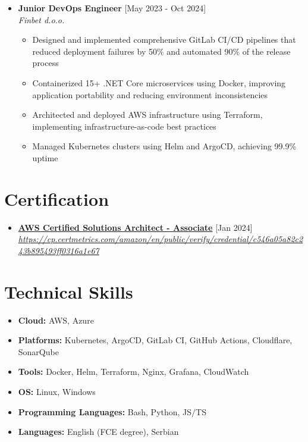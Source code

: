 \documentclass[12pt,a4paper]{moderncv}
\begin{document}
\begin{itemize}
	\item \textbf{Junior DevOps Engineer} \hfill [May 2023 - Oct 2024]\\
	\textit{Finbet d.o.o.}
	\begin{itemize}
		\vspace{-0.75em}
		\setlength\itemsep{0.1em}
		\item Designed and implemented comprehensive GitLab CI/CD pipelines that reduced deployment failures by 50\% and automated 90\% of the release process
		\item Containerized 15+ .NET Core microservices using Docker, improving application portability and reducing environment inconsistencies
		\item Architected and deployed AWS infrastructure using Terraform, implementing infrastructure-as-code best practices
		\item Managed Kubernetes clusters using Helm and ArgoCD, achieving 99.9\% uptime
	\end{itemize}

\end{itemize}

\section{Certification}

\begin{itemize}
	\item \textbf{\href{https://aws.amazon.com/certification/certified-solutions-architect-associate/}{AWS Certified Solutions Architect - Associate}} \hfill [Jan 2024]\\
	\fontsize{8}{1}\textit{\href{https://cp.certmetrics.com/amazon/en/public/verify/credential/c546a05a82c243b895493ff0316a1e67}{https://cp.certmetrics.com/amazon/en/public/verify/credential/c546a05a82c243b895493ff0316a1e67}}
	
\end{itemize}


\section{Technical Skills}

\begin{itemize}
		
	\item \textbf{Cloud: } AWS, Azure
	\item \textbf{Platforms: } Kubernetes, ArgoCD, GitLab CI, GitHub Actions, Cloudflare, SonarQube
	\item \textbf{Tools: } Docker, Helm, Terraform, Nginx, Grafana, CloudWatch
	\item \textbf{OS: } Linux, Windows
	\item \textbf{Programming Languages: } Bash, Python, JS$\slash$TS
	\item \textbf{Languages: } English (FCE degree), Serbian

\end{itemize}

\end{document}
